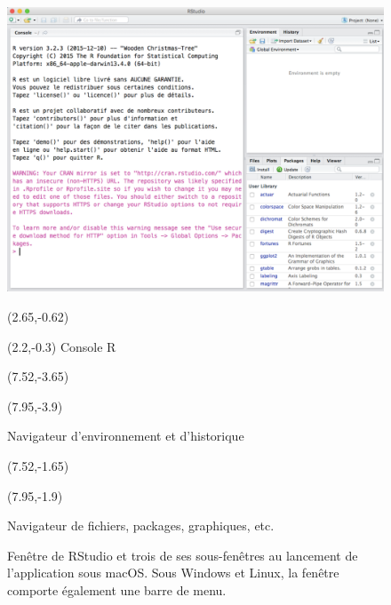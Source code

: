 \begin{figure}[t]
  \includegraphics{rstudiowindow-screenshot}
  \vspace{0.5\TPVertModule}

  \begin{textblock}{0.5}(2.65,-0.62)
    \large\faLongArrowDown
  \end{textblock}
  \begin{textblock}{2}(2.2,-0.3)
    \footnotesize\sffamily Console R
  \end{textblock}

  \begin{textblock}{1}(7.52,-3.65)
    \large\faLongArrowRight
  \end{textblock}
  \begin{textblock}{2.2}(7.95,-3.9)
    \footnotesize\sffamily\raggedright Navigateur d'environnement et d'historique
  \end{textblock}

  \begin{textblock}{1}(7.52,-1.65)
    \large\faLongArrowRight
  \end{textblock}
  \begin{textblock}{2.2}(7.95,-1.9)
    \footnotesize\sffamily\raggedright Navigateur de fichiers, packages, graphiques, etc.
  \end{textblock}
  \caption{Fenêtre de RStudio et trois de ses sous-fenêtres au
    lancement de l'application sous macOS. Sous Windows et Linux, la
    fenêtre comporte également une barre de menu.}
  \label{fig:rstudio:rstudiowindow}
\end{figure}

